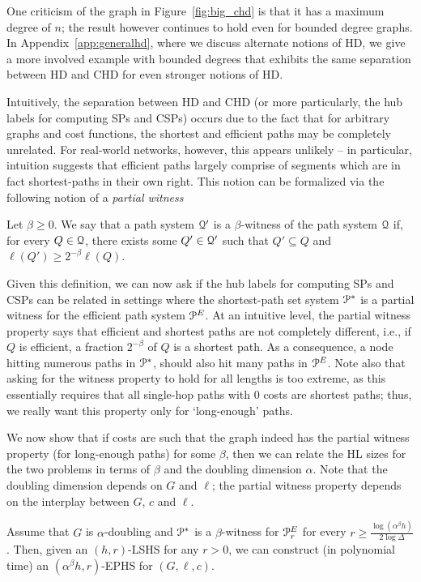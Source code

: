 \begin{remark}
One criticism of the graph in Figure~\ref{fig:big_chd} is that it has a maximum degree of $n$; the result however continues to hold even for bounded degree graphs.
In Appendix~\ref{app:generalhd}, where we discuss alternate notions of HD, we give a more involved example with bounded degrees that exhibits the same separation between HD and CHD for even stronger notions of HD.
\end{remark}

Intuitively, the separation between HD and CHD (or more particularly, the hub labels for computing SPs and CSPs) occurs due to the fact that for arbitrary graphs and cost functions, the shortest and efficient paths may be completely unrelated. 
For real-world networks, however, this appears unlikely -- in particular, intuition suggests that efficient paths largely comprise of segments which are in fact shortest-paths in their own right. This notion can be formalized via the following notion of a \emph{partial witness} 
\begin{definition}
Let $\beta\geq 0$.
We say that a path system $\mathcal{Q}'$ is a $\beta$-witness of the path system $\mathcal{Q}$ if, for every $Q\in\mathcal{Q}$, there exists some $Q'\in\mathcal{Q}'$ such that $Q'\subseteq Q$ and $\ell(Q')\geq 2^{-\beta}\ell(Q)$.
\end{definition}
Given this definition, we can now ask if the hub labels for computing SPs and CSPs can be related in settings where the shortest-path set system $\mathcal{P}^*$ is a partial witness for the efficient path system $\mathcal{P}^E$. At an intuitive level, the partial witness property says that efficient and shortest paths are not completely different, i.e., if $Q$ is efficient, a fraction $2^{-\beta}$ of $Q$ is a shortest path.
As a consequence, a node hitting numerous paths in $\mathcal{P}^*$, should also hit many paths in $\mathcal{P}^E$.
Note also that asking for the witness property to hold for all lengths is too extreme, as this essentially requires that all single-hop paths with 0 costs are shortest paths; thus, we really want this property only for `long-enough' paths. 


We now show that if costs are such that the graph indeed has the partial witness property (for long-enough paths) for some $\beta$, then we can relate the HL sizes for the two problems in terms of $\beta$ and the doubling dimension $\alpha$. Note that the doubling dimension depends on $G$ and $\ell$; the partial witness property depends on the interplay between $G$, $c$ and $\ell$.
\begin{theorem}\label{theo:witness_doubling}
Assume that $G$ is $\alpha$-doubling and $\mathcal{P}^*$ is a $\beta$-witness for $\mathcal{P}^E_r$ for every $r\geq \frac{\log(\alpha^\beta h)}{2\log\Delta}$. 
Then, given an $(h,r)$-LSHS for any $r>0$, we can construct (in polynomial time) an $(\alpha^{\beta} h,r)$-EPHS for $(G,\ell,c)$. 
\end{theorem}

